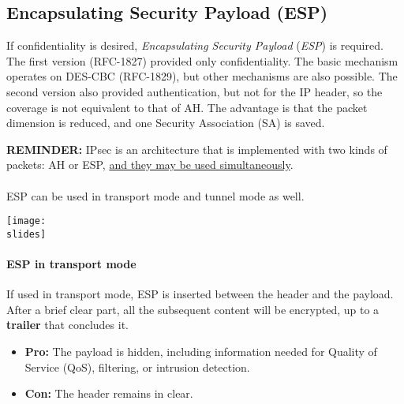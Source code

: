 \subsection{Encapsulating Security Payload (ESP)}
If confidentiality is desired, \textit{Encapsulating Security Payload} (\textit{ESP}) is required.
The first version (RFC-1827) provided only confidentiality. The basic mechanism operates on DES-CBC (RFC-1829), but other mechanisms are also possible. The second version also provided authentication, but not for the IP header, so the coverage is not equivalent to that of AH. The advantage is that the packet dimension is reduced, and one Security Association (SA) is saved.

\textbf{REMINDER:} IPsec is an architecture that is implemented with two kinds of packets: AH or ESP, \underline{and they may be used simultaneously}.

\paragraph{}
ESP can be used in transport mode and tunnel mode as well.

\vspace*{5mm}
\noindent
\begin{minipage}{0.5\textwidth}
    \centering
    \texttt{[image: \\slides]}
\end{minipage}
\hspace{0.05\textwidth}
\begin{minipage}{0.4\textwidth}
    \paragraph{ESP in transport mode}
    If used in transport mode, ESP is inserted between the header and the payload. After a brief clear part, all the subsequent content will be encrypted, up to a \textbf{trailer} that concludes it.
    \begin{itemize}
        \item \textbf{Pro:} The payload is hidden, including information needed for Quality of Service (QoS), filtering, or intrusion detection.
        \item \textbf{Con:} The header remains in clear.
    \end{itemize}
\end{minipage}


